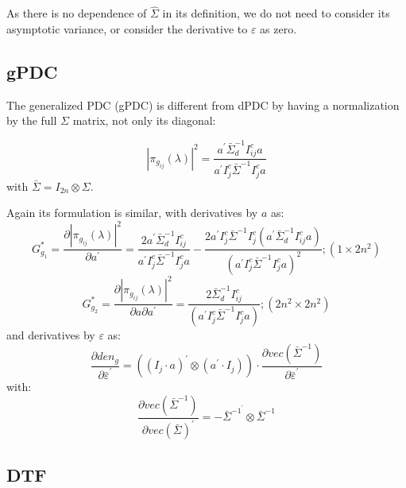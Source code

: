 \documentclass[a4paper,10pt]{article}
\begin{document}
As there is no dependence of $\hat{\Sigma}$ in its definition, we do not need to consider its asymptotic variance, or consider the derivative to $\varepsilon$ as zero.

\subsection{gPDC}

The generalized PDC (gPDC) is different from dPDC by having a normalization by the full $\Sigma$ matrix, not only its diagonal:

\begin{equation}
 |\pi_{g_{ij}}(\lambda)|^{2}  = \frac{a^{'} \bar{\Sigma}_{d}^{-1} I_{ij}^{c} a}{a^{'} I_{j}^{c} \bar{\Sigma}^{-1} I_{j}^{c} a}
\end{equation}
with $\bar{\Sigma} = I_{2n} \otimes \Sigma$.

Again its formulation is similar, with derivatives by $a$ as:
\begin{equation}
G_{g_1}^{\ast} = \frac{\partial |\pi_{g_{ij}}(\lambda)|^{2}}{\partial a^{'}} = \frac{2 a^{'} \bar{\Sigma}_{d}^{-1} I_{ij}^{c}} {a^{'} I_{j}^{c} \bar{\Sigma}^{-1} I_{j}^{c} a} - \frac{2 a^{'} I_{j}^{c} \bar{\Sigma}^{-1} I_{j}^{c} (a^{'} \bar{\Sigma}_{d}^{-1} I_{ij}^{c} a)} {(a^{'} I_{j}^{c} \bar{\Sigma}^{-1} I_{j}^{c} a)^{2}}; (1 \times 2n^{2})
\end{equation}
\begin{equation}
G_{g_2}^{\ast} = \frac{\partial |\pi_{g_{ij}}(\lambda)|^{2}}{\partial a \partial a^{'}} = \frac{2 \bar{\Sigma}_{d}^{-1} I_{ij}^{c}}{(a^{'} I_{j}^{c} \bar{\Sigma}^{-1} I_{j}^{c} a)}; (2n^{2} \times 2n^{2})
\end{equation}
and derivatives by $\varepsilon$ as:
\begin{equation}
\frac{\partial den_{g}}{\partial \bar{\varepsilon}^{'}} = ((I_{j} \cdot a)^{'} \otimes (a^{'} \cdot I_{j})) \cdot \frac{\partial vec(\bar{\Sigma}^{-1})}{\partial \bar{\varepsilon}^{'}}
\end{equation}
with:
\begin{equation}
\frac{\partial vec(\bar{\Sigma}^{-1})}{\partial vec(\bar{\Sigma})^{'}} = -\bar{\Sigma}^{-1^{'}} \otimes \bar{\Sigma}^{-1}
\end{equation}

\subsection{DTF}
\end{document}
